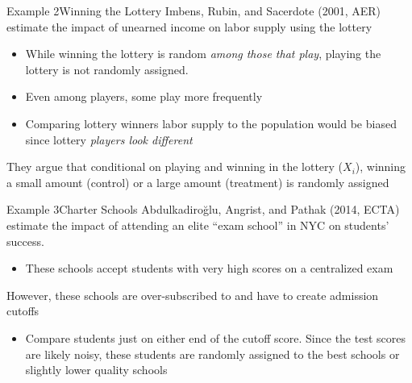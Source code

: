 \documentclass[aspectratio=169,t,11pt,table]{beamer}
\begin{document}
\begin{frame}{Example 2}{Winning the Lottery}
  Imbens, Rubin, and Sacerdote (2001, AER) estimate the impact of unearned income on labor supply using the lottery
  \begin{itemize}
    \item While winning the lottery is random \emph{among those that play}, playing the lottery is not randomly assigned. 
    
    \item Even among players, some play more frequently
    
    \item Comparing lottery winners labor supply to the population would be biased since lottery \emph{players look different}
  \end{itemize}
  
  \pause
  \bigskip
  They argue that conditional on playing and winning in the lottery ($X_i$), winning a small amount (control) or a large amount (treatment) is randomly assigned
\end{frame}

\begin{frame}{Example 3}{Charter Schools}
  Abdulkadiroğlu, Angrist, and Pathak (2014, ECTA) estimate the impact of attending an elite ``exam school'' in NYC on students' success.
  \begin{itemize}
    \item These schools accept students with very high scores on a centralized exam
  \end{itemize}

  \pause
  \bigskip
  However, these schools are over-subscribed to and have to create admission cutoffs 
  \begin{itemize}
    \item Compare students just on either end of the cutoff score. Since the test scores are likely noisy, these students are randomly assigned to the best schools or slightly lower quality schools
  \end{itemize}
\end{frame}

\end{document}
